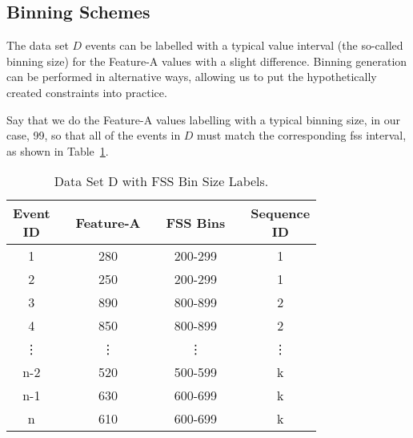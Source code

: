 \subsection{Binning Schemes}

The data set $D$ events can be labelled with a typical value interval (the so-called binning size) for the Feature-A values with a slight difference. Binning generation can be performed in alternative ways, allowing us to put the hypothetically created constraints into practice.

Say that we do the Feature-A values labelling with a typical binning size, in our case, 99, so that all of the events in $D$ must match the corresponding \ac{fss} interval, as shown in Table~\ref{Tab: D-dataset-FSS}. 
\begin{table}[ht!]
	\centering
	\setlength{\arrayrulewidth}{0.79pt}%
	\caption{Data Set D with FSS Bin Size Labels.} 
	\begin{tabular}{|cc|c|ccc|c|}
		\hline \rowcolor[HTML]{FFFFC7}
		\makecell{Event\\ID} 	&& Feature-A    	&& FSS Bins && \makecell{Sequence\\ID}  \\ \hline
		1 	      && 280	    && 200-299	&& 1 		     \\
		2 		  && 250	    && 200-299	&& 1 		     \\
		3 	      && 890	    && 800-899	&& 2 		     \\
		4 		  && 850	    && 800-899	&& 2 		     \\
		\vdots	  && \vdots  	&& \vdots	&& \vdots 	     \\
		n-2 	  && 520	    && 500-599	&& k 		     \\
		n-1       && 630	    && 600-699	&& k 		     \\
		n 		  && 610	    && 600-699	&& k 		     \\ \hline
	\end{tabular}
	\label{Tab: D-dataset-FSS}
\end{table}

